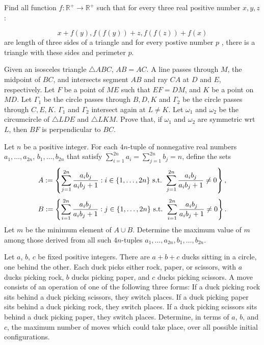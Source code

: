 \documentclass[11pt]{scrartcl}
\begin{document}
\begin{problem}[1617857952543104985]
Find all function $ f: \mathbb{R}^{+} \to \mathbb{R}^{+}$ such that for every three real positive number $x,y,z$ :

$$ x+f(y) , f(f(y)) + z , f(f(z))+f(x) $$
are length of three sides of a triangle and for every postive number $p$ , there is a triangle with these sides and perimeter $p$.
\end{problem}
\begin{problem}[1620616963605432410]
Given an isosceles triangle $\triangle ABC$, $AB=AC$. A line passes through $M$, the midpoint of $BC$, and intersects segment $AB$ and ray $CA$ at $D$ and $E$, respectively. Let $F$ be a point of $ME$ such that $EF=DM$, and $K$ be a point on $MD$. Let $\Gamma_1$ be the circle passes through $B,D,K$ and $\Gamma_2$ be the circle passes through $C,E,K$. $\Gamma_1$ and $\Gamma_2$ intersect again at $L \neq K$. Let $\omega_1$ and $\omega_2$ be the circumcircle of $\triangle LDE$ and $\triangle LKM$. Prove that, if $\omega_1$ and $\omega_2$ are symmetric wrt $L$, then $BF$ is perpendicular to $BC$.
\end{problem}
\begin{problem}[1634175238796686183]
Let $n$ be a positive integer. For each $4n$-tuple of nonnegative real numbers $a_1,\ldots,a_{2n}$, $b_1,\ldots,b_{2n}$ that satisfy $\sum_{i=1}^{2n}a_i=\sum_{j=1}^{2n}b_j=n$, define the sets
\[A:=\left\{\sum_{j=1}^{2n}\frac{a_ib_j}{a_ib_j+1}:i\in\{1,\ldots,2n\} \textup{ s.t. }\sum_{j=1}^{2n}\frac{a_ib_j}{a_ib_j+1}\neq 0\right\},\]\[B:=\left\{\sum_{i=1}^{2n}\frac{a_ib_j}{a_ib_j+1}:j\in\{1,\ldots,2n\} \textup{ s.t. }\sum_{i=1}^{2n}\frac{a_ib_j}{a_ib_j+1}\neq 0\right\}.\]Let $m$ be the minimum element of $A\cup B$. Determine the maximum value of $m$ among those derived from all such $4n$-tuples $a_1,\ldots,a_{2n},b_1,\ldots,b_{2n}$.
\end{problem}
\begin{problem}[1634257707699822785]
Let $a$, $b$, $c$ be fixed positive integers. There are $a+b+c$ ducks sitting in a
circle, one behind the other. Each duck picks either rock, paper, or scissors, with $a$ ducks
picking rock, $b$ ducks picking paper, and $c$ ducks picking scissors.
A move consists of an operation of one of the following three forms:
If a duck picking rock sits behind a duck picking scissors, they switch places.
If a duck picking paper sits behind a duck picking rock, they switch places.
If a duck picking scissors sits behind a duck picking paper, they switch places.
Determine, in terms of $a$, $b$, and $c$, the maximum number of moves which could take
place, over all possible initial configurations.
\end{problem}
\end{document}
